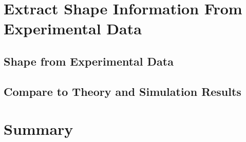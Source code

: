 \section{Extract Shape Information From Experimental Data}
\label{sec:extract_shape_information_from_experimental_data}

\subsection{Shape from Experimental Data}
\label{sub:shape_from_experimental_data}

\subsection{Compare to Theory and Simulation Results}
\label{sub:compare_to_theory_and_simulation_results}


\section{Summary}
\label{sec:summary}



